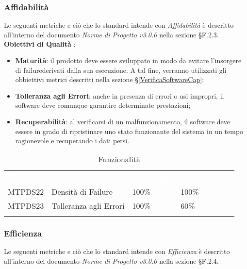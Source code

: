 \subsubsection{Affidabilità}

Le seguenti metriche e ciò che lo standard intende con \textit{Affidabilità} è descritto all'interno del documento \textit{Norme di Progetto v3.0.0} nella sezione §F.2.3. \\
\textbf{Obiettivi di Qualità} :

\begin{itemize}
	\item \textbf{Maturità}: il prodotto deve essere sviluppato in modo da evitare l'insorgere di failure\glossario derivati dalla sua esecuzione. A tal fine, verranno utilizzati gli obbiettivi metrici descritti nella sezione §\ref{VerificaSoftwareCap};
	\item \textbf{Tolleranza agli Errori}: anche in presenza di errori o usi impropri, il software deve comunque garantire determinate prestazioni;
	\item \textbf{Recuperabilità}: al verificarsi di un malfunzionamento, il software deve essere in grado di ripristinare uno stato funzionante del sistema in un tempo ragionevole e recuperando i dati persi.
\end{itemize}

\begin{longtable}{|C{.15\textwidth}|C{.24\textwidth}|C{.24\textwidth}|C{.24\textwidth}|}
\hline
{}\textbf{\textcolor{white}{ID}} & \textbf{\textcolor{white}{Nome}} & \textbf{\textcolor{white}{Ottimalità}} & \textbf{\textcolor{white}{Accettabilità}}\\
MTPDS22 & Densità di Failure & 100\% & 100\%\\
\hline
{}MTPDS23 & Tolleranza agli Errori & 100\% & 60\% \\ 
\hline
\caption{Funzionalità}
\label{Funzionalità}
\end{longtable}



\subsubsection{Efficienza}

Le seguenti metriche e ciò che lo standard intende con \textit{Efficienza} è descritto all'interno del documento \textit{Norme di Progetto v3.0.0} nella sezione §F.2.4. \\

